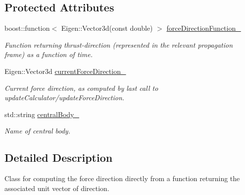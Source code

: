 \subsection*{Protected Attributes}
\begin{DoxyCompactItemize}
\item 
boost\+::function$<$ Eigen\+::\+Vector3d(const double) $>$ \hyperlink{classtudat_1_1propulsion_1_1DirectionBasedForceGuidance_a12e3ff59ea24dd27600a3cf911bce0dd}{force\+Direction\+Function\+\_\+}\hypertarget{classtudat_1_1propulsion_1_1DirectionBasedForceGuidance_a12e3ff59ea24dd27600a3cf911bce0dd}{}\label{classtudat_1_1propulsion_1_1DirectionBasedForceGuidance_a12e3ff59ea24dd27600a3cf911bce0dd}

\begin{DoxyCompactList}\small\item\em Function returning thrust-\/direction (represented in the relevant propagation frame) as a function of time. \end{DoxyCompactList}\item 
Eigen\+::\+Vector3d \hyperlink{classtudat_1_1propulsion_1_1DirectionBasedForceGuidance_a6a087c52317b694ada3e81c100ac0904}{current\+Force\+Direction\+\_\+}\hypertarget{classtudat_1_1propulsion_1_1DirectionBasedForceGuidance_a6a087c52317b694ada3e81c100ac0904}{}\label{classtudat_1_1propulsion_1_1DirectionBasedForceGuidance_a6a087c52317b694ada3e81c100ac0904}

\begin{DoxyCompactList}\small\item\em Current force direction, as computed by last call to update\+Calculator/update\+Force\+Direction. \end{DoxyCompactList}\item 
std\+::string \hyperlink{classtudat_1_1propulsion_1_1DirectionBasedForceGuidance_a148497bce447d1213046f6f49565fe9c}{central\+Body\+\_\+}\hypertarget{classtudat_1_1propulsion_1_1DirectionBasedForceGuidance_a148497bce447d1213046f6f49565fe9c}{}\label{classtudat_1_1propulsion_1_1DirectionBasedForceGuidance_a148497bce447d1213046f6f49565fe9c}

\begin{DoxyCompactList}\small\item\em Name of central body. \end{DoxyCompactList}\end{DoxyCompactItemize}


\subsection{Detailed Description}
Class for computing the force direction directly from a function returning the associated unit vector of direction. 

